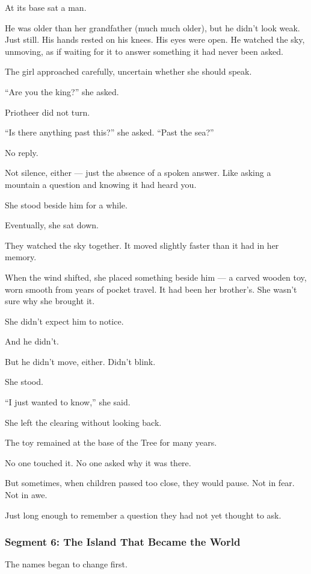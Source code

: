 \documentclass[9pt]{article}
\begin{document}
At its base sat a man.

He was older than her grandfather (much much older), but he didn’t look weak. Just still. His hands rested on his knees. His eyes were open. He watched the sky, unmoving, as if waiting for it to answer something it had never been asked.

The girl approached carefully, uncertain whether she should speak.

``Are you the king?'' she asked.

Priotheer did not turn.

``Is there anything past this?'' she asked. ``Past the sea?''

No reply.

Not silence, either — just the absence of a spoken answer. Like asking a mountain a question and knowing it had heard you.

She stood beside him for a while.

Eventually, she sat down.

They watched the sky together. It moved slightly faster than it had in her memory.

When the wind shifted, she placed something beside him — a carved wooden toy, worn smooth from years of pocket travel. It had been her brother’s. She wasn’t sure why she brought it.

She didn’t expect him to notice.

And he didn’t.

But he didn’t move, either. Didn’t blink.

She stood.

``I just wanted to know,'' she said.

She left the clearing without looking back.

The toy remained at the base of the Tree for many years.

No one touched it. No one asked why it was there.

But sometimes, when children passed too close, they would pause. Not in fear. Not in awe.

Just long enough to remember a question they had not yet thought to ask.

\newpage

\subsubsection*{Segment 6: The Island That Became the World}

The names began to change first.
\end{document}
